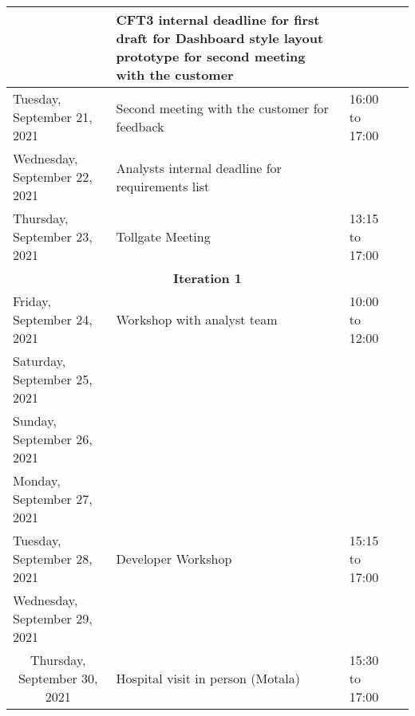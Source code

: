\begin{adjustbox}{width=1.2\textwidth}
\begin{tabular}{|l|l|l|l|}
\multicolumn{ 1}{|r|}{} & CFT3 internal deadline for first draft for Dashboard style layout prototype for second meeting with the customer &            &            \\
\hline
Tuesday, September 21, 2021 & Second meeting with the customer for feedback & 16:00 to 17:00 &            \\
\hline
Wednesday, September 22, 2021 & Analysts internal deadline for requirements list &            &            \\
\hline
Thursday, September 23, 2021 & Tollgate Meeting & 13:15 to 17:00 &            \\
\hline
          \multicolumn{ 4}{|c}{{\bf Iteration 1}} \\
\hline
Friday, September 24, 2021 & Workshop with analyst team  & 10:00 to 12:00 &            \\
\hline
Saturday, September 25, 2021 &            &            &            \\
\hline
Sunday, September 26, 2021 &            &            &            \\
\hline
Monday, September 27, 2021 &            &            &            \\
\hline
Tuesday, September 28, 2021 & Developer Workshop & 15:15 to 17:00 &            \\
\hline
Wednesday, September 29, 2021 &            &            &            \\
\hline
\multicolumn{ 1}{|c|}{Thursday, September 30, 2021} & Hospital visit in person (Motala) & 15:30 to 17:00 &            \\


\end{tabular}
\end{adjustbox}
